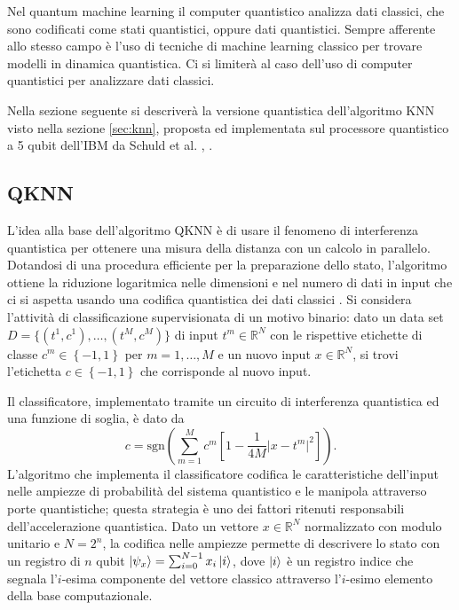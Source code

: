 Nel quantum machine learning il computer quantistico analizza dati classici, che sono 
codificati come stati quantistici, oppure dati quantistici. Sempre afferente allo stesso 
campo è l'uso di tecniche di machine learning classico per trovare modelli in dinamica 
quantistica. Ci si limiterà al caso dell'uso di computer quantistici per analizzare dati 
classici. 

Nella sezione seguente si descriverà la versione quantistica dell'algoritmo \ac{KNN} visto 
nella sezione \ref{sec:knn}, proposta ed implementata sul processore quantistico a 5 
qubit dell'IBM da Schuld et al. \cite{10.1007/978-3-319-13560-1_17}, \cite{schuld}. 

\subsection{QKNN} \label{sec:qknn}


L'idea alla base dell'algoritmo \ac{QKNN} è di usare il fenomeno di interferenza 
quantistica per ottenere una misura della distanza con un calcolo in parallelo. 
Dotandosi di una procedura efficiente per la preparazione dello stato, l'algoritmo 
ottiene la riduzione logaritmica nelle dimensioni e nel numero di dati in input che 
ci si aspetta usando una codifica quantistica dei dati 
classici \cite{quantum_support_vector_machine}.
Si considera l'attività di classificazione supervisionata di un motivo binario: 
dato un data set $D=\{ (t^1,c^1),\ldots,(t^M,c^M) \}$ di input $t^m\in\mathbb{R}^N$ 
con le rispettive etichette di classe $c^m\in \left\{ -1,1 \right\} $ per $m=1,\ldots,M$ 
e un nuovo input $x\in\mathbb{R}^N$, si trovi l'etichetta $c\in\left\{ -1,1 \right\}$ che 
corrisponde al nuovo input. 

Il classificatore, implementato tramite un circuito di interferenza quantistica 
ed una funzione di soglia, è dato da 
\begin{equation}
    c = \text{sgn} \left( \sum_{m=1}^M c^m \left[ 1 - \frac{1}{4M} | x - t^m |^2 \right] \right). 
\end{equation}
L'algoritmo che implementa il classificatore codifica le caratteristiche dell'input nelle 
ampiezze di probabilità del sistema quantistico e le manipola attraverso porte 
quantistiche; questa strategia è uno dei fattori ritenuti responsabili 
dell'accelerazione quantistica. 
Dato un vettore $x\in\mathbb{R}^N$ normalizzato con modulo unitario e $N=2^n$, 
la codifica nelle ampiezze permette di descrivere lo stato con un registro di $n$ qubit 
$\ket{\psi_x} = \sum_{i=0}^{N-1} x_i \ket{i}$, dove $\ket{i}$ è un registro indice che 
segnala l'$i$-esima componente del vettore classico attraverso l'$i$-esimo elemento della 
base computazionale. 

